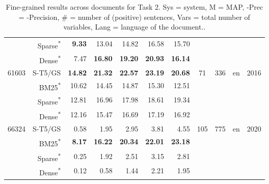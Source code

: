 \documentclass[11pt]{article}
\begin{document}
\begin{table*}[]
\begin{tabular}{l|r|r|r|r|r|r|c|c|c|c}
     &    Sparse\textsuperscript{*} &   \textbf{9.33} &  13.04 &   14.82 &   16.58 &        15.70 &       &     &         &           \\
     &    Dense\textsuperscript{*} &   7.47 &  \textbf{16.80} &   \textbf{19.20} &   \textbf{20.93} &        \textbf{16.14} &       &     &         &           \\
    \hline
    \multirow{4}{3em}{61603} &    S-T5/GS &  \textbf{14.82} &  \textbf{21.32} &   \textbf{22.57} &   \textbf{23.19} &        \textbf{20.68} &       \multirow{4}{2em}{71} &    \multirow{4}{1em}{336} &        \multirow{4}{1em}{en} &            \multirow{4}{2em}{2016} \\
     &    BM25\textsuperscript{*} &  10.62 &  14.45 &   14.87 &   15.30 &        12.51 &        &     &         &           \\
     &    Sparse\textsuperscript{*} &  12.81 &  16.96 &   17.98 &   18.61 &        19.34 &        &     &         &           \\
     &    Dense\textsuperscript{*} &  12.16 &  15.47 &   16.69 &   17.19 &        16.92 &        &     &         &           \\
    \hline
    \multirow{4}{3em}{66324} &    S-T5/GS &   0.58 &   1.95 &    2.95 &    3.81 &         4.55 &      \multirow{4}{2em}{105} &    \multirow{4}{1em}{775} &        \multirow{4}{1em}{en} &            \multirow{4}{2em}{2020} \\
     &    BM25\textsuperscript{*} &   \textbf{8.17} &  \textbf{16.22} &   \textbf{20.34} &   \textbf{22.01} &        \textbf{23.18} &       &     &         &           \\
     &    Sparse\textsuperscript{*} &   0.25 &   1.92 &    2.51 &    3.15 &         2.81 &       &     &         &           \\
     &    Dense\textsuperscript{*} &   0.12 &   0.58 &    1.44 &    2.21 &         1.95 &       &     &         &           \\
    \hline
    \end{tabular}
    \caption{Fine-grained results across documents for Task 2. Sys = system, M = MAP, -Prec = -Precision, \# = number of (positive) sentences, Vars = total number of variables, Lang = language of the document..}
    \label{tab:T2-AvgDoc}
\end{table*}
\end{document}

